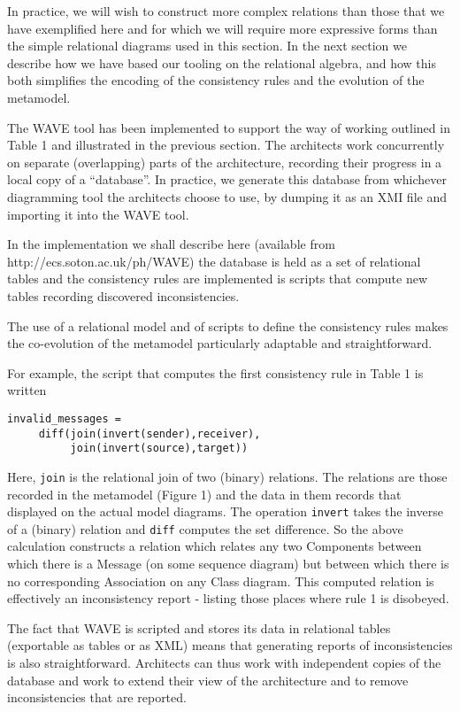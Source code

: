 \documentclass[times, 10pt,twocolumn]{article}
\begin{document}
In practice, we will wish to construct more complex relations than those that we have exemplified here and for which we will require more expressive forms than the simple relational diagrams used in this section. In the next section we describe how we have based our tooling on the relational algebra, and how this both simplifies the encoding of the consistency rules and the evolution of the metamodel.



\noindent The WAVE tool has been implemented to support the way of working outlined in Table 1 and illustrated in the previous section. The architects work concurrently on separate (overlapping) parts of the architecture, recording their progress in a local copy of a ``database''. In practice, we generate this database from whichever diagramming tool the architects choose to use, by dumping it as an XMI file and importing it into the WAVE tool.

In the implementation we shall describe here (available from http://ecs.soton.ac.uk/ph/WAVE) the database is held as a set of relational tables and the consistency rules are implemented is scripts that compute new tables recording discovered inconsistencies. 

The use of a relational model and of scripts to define the consistency rules makes the co-evolution of the metamodel particularly adaptable and straightforward.

For example, the script that computes the first consistency rule in Table 1 is written \small
\begin{verbatim}
invalid_messages =
     diff(join(invert(sender),receiver),
          join(invert(source),target))
\end{verbatim}\normalsize
Here, {\small\verb$join$} is the relational join of two (binary) relations. The relations are those recorded in the metamodel (Figure 1) and the data in them records that displayed on the actual model diagrams. The operation {\small\verb$invert$} takes the inverse of a (binary) relation and {\small\verb$diff$} computes the set difference. So the above calculation constructs a relation which relates any two Components between which there is a Message (on some sequence diagram) but between which there is no corresponding Association on any Class diagram. This computed relation is effectively an inconsistency report - listing those places where rule 1 is disobeyed.

The fact that WAVE is scripted and stores its data in relational tables (exportable as tables or as XML) means that generating reports of inconsistencies is also straightforward. Architects can thus work with independent copies of the database and work to extend their view of the architecture and to remove inconsistencies that are reported. 
\end{document}
